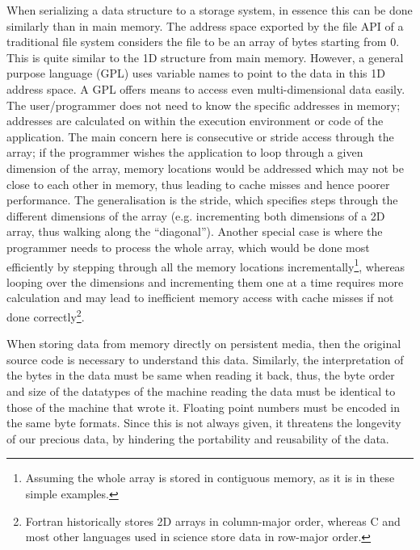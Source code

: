 \documentclass{../../template/esiwace-report}
\begin{document}
When serializing a data structure to a storage system, in essence this can be done similarly than in main memory.
The address space exported by the file API of a traditional file system considers the file to be an array of bytes starting from 0.
This is quite similar to the 1D structure from main memory.
However, a general purpose language (GPL) uses variable names to point to the data in this 1D address space.
A GPL offers means to access even multi-dimensional data easily.
The user/programmer does not need to know the specific addresses in memory; addresses are calculated on within the execution environment or code of the application.
The main concern here is consecutive or stride access through the array; if the programmer wishes the application to loop through a given dimension of the array, memory locations would be addressed which may not be close to each other in memory, thus leading to cache misses and hence poorer performance.  The generalisation is the stride, which specifies steps through the different dimensions of the array (e.g. incrementing both dimensions of a 2D array, thus walking along the ``diagonal'').  Another special case is where the programmer needs to process the whole array, which would be done most efficiently by stepping through all the memory locations incrementally\footnote{Assuming the whole array is stored in contiguous memory, as it is in these simple examples.}, whereas looping over the dimensions and incrementing them one at a time requires more calculation and may lead to inefficient memory access with cache misses if not done correctly\footnote{Fortran historically stores 2D arrays in column-major order, whereas C and most other languages used in science store data in row-major order.}.


When storing data from memory directly on persistent media, then the original source code is necessary to understand this data.
Similarly, the interpretation of the bytes in the data must be same when reading it back, thus, the byte order and size of the datatypes of the machine reading the data must be identical to those of the machine that wrote it.  Floating point numbers must be encoded in the same byte formats.
Since this is not always given, it threatens the longevity of our precious data, by hindering the portability and reusability of the data.
\end{document}
